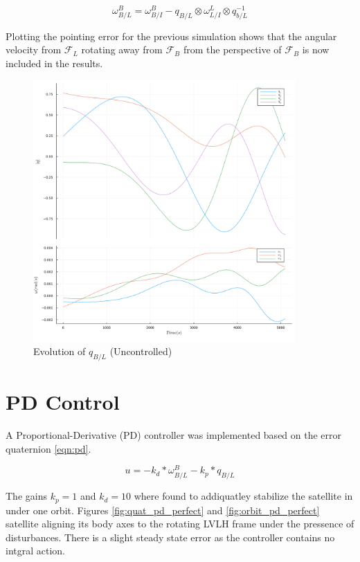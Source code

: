 \documentclass{article}
\begin{document}
\begin{equation}
	\omega_{B/L}^B = \omega_{B/I}^{B} - q_{B/L} \otimes \omega_{L/I}^{L} \otimes q_{b/L}^{-1}
	\label{eqn:w_b_lvlh}
\end{equation}

Plotting the pointing error for the previous simulation shows that the angular velocity from $\mathcal{F}_L$ rotating away from $\mathcal{F}_B$ from the perspective of $\mathcal{F}_B$ is now included in the results.

\begin{figure}[h]
	\centering
	\includegraphics[width=10cm]{images/dist_attitude_lvlh}
	\caption{Evolution of $q_{B/L}$ (Uncontrolled)}
\end{figure}

\section{PD Control}

A Proportional-Derivative (PD) controller was implemented based on the error quaternion \ref{eqn:pd}. 

\begin{equation}
	u = -k_d * \omega_{B/L}^{B} - k_p * q_{B/L}
	\label{eqn:pd}
\end{equation}

The gains $k_p = 1$ and $k_d = 10$ where found to addiquatley stabilize the satellite in under one orbit. Figures \ref{fig:quat_pd_perfect} and \ref{fig:orbit_pd_perfect} satellite aligning its body axes to the rotating LVLH frame under the pressence of disturbances. There is a slight steady state error as the controller contains no intgral action.
\end{document}
